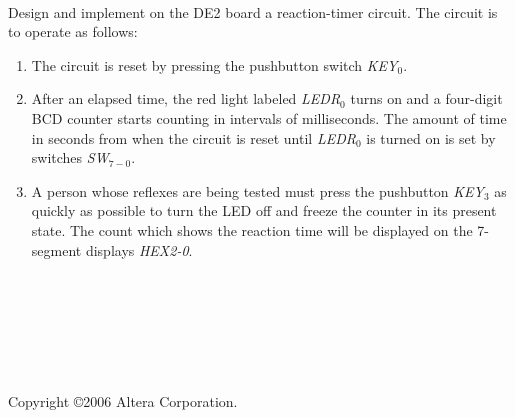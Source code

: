 \documentclass[psfig,10pt,fullpage]{article}
\begin{document}
~\\
\noindent
Design and implement on the DE2 board a reaction-timer circuit. The circuit is to operate
as follows:
\begin{enumerate}
\item The circuit is reset by pressing the pushbutton switch {\it KEY}$_0$.
\item After an elapsed time, the red light labeled {\it LEDR}$_0$ turns on and
a four-digit BCD counter starts counting in intervals of milliseconds. 
The amount of time in seconds from when the circuit is reset until {\it LEDR}$_0$
is turned on is set by switches {\it SW}$_{7-0}$.
\item A person whose reflexes are being
tested must press the pushbutton {\it KEY}$_3$ as quickly as possible to turn the
LED off and freeze the counter in its present state. The count which
shows the reaction time will be displayed on the 7-segment displays {\it HEX2-0}.
\end{enumerate}
~\\
~\\
~\\
~\\
~\\
~\\
Copyright \copyright 2006 Altera Corporation. 
\end{document}
